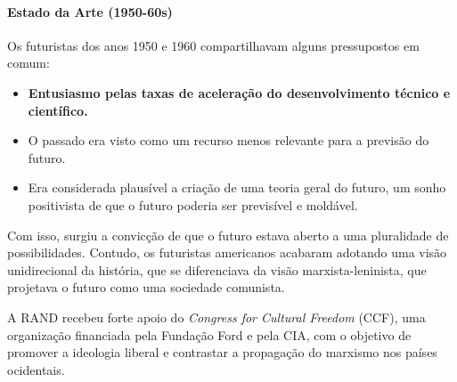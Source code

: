 \paragraph{Estado da Arte (1950-60s)}
Os futuristas dos anos 1950 e 1960 compartilhavam alguns pressupostos em comum:
\begin{itemize}
    \item \textbf{Entusiasmo pelas taxas de aceleração do desenvolvimento técnico e científico.}
    \item O passado era visto como um recurso menos relevante para a previsão do futuro.
    \item Era considerada plausível a criação de uma teoria geral do futuro, um sonho positivista de que o futuro poderia ser previsível e moldável.
\end{itemize}

Com isso, surgiu a convicção de que o futuro estava aberto a uma pluralidade de possibilidades. Contudo, os futuristas americanos acabaram adotando uma visão unidirecional da história, que se diferenciava da visão marxista-leninista, que projetava o futuro como uma sociedade comunista. 

A RAND recebeu forte apoio do \textit{Congress for Cultural Freedom} (CCF), uma organização financiada pela Fundação Ford e pela CIA, com o objetivo de promover a ideologia liberal e contrastar a propagação do marxismo nos países ocidentais.

\sectionbreak